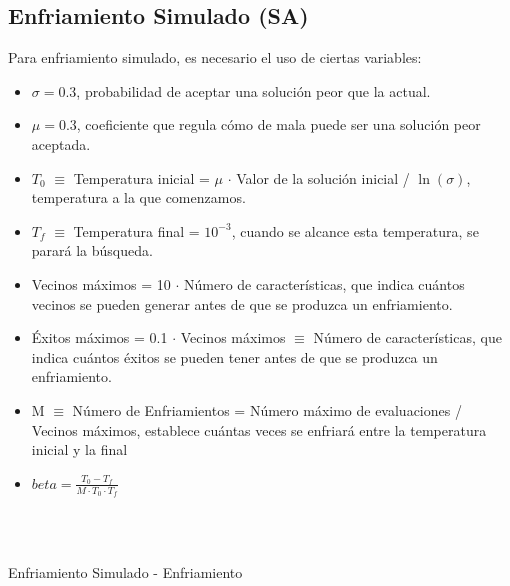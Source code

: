 \documentclass[a4paper, 11pt]{article}
\begin{document}
		\subsection{Enfriamiento Simulado (\textbf{SA})}
			Para enfriamiento simulado, es necesario el uso de ciertas variables:
			\begin{itemize}
				\item $\sigma = 0.3$, probabilidad de aceptar una solución peor que la actual.
				\item $\mu = 0.3$, coeficiente que regula cómo de mala puede ser una solución peor
				aceptada.
				\item $T_0$ $\equiv$ Temperatura inicial = $\mu$ $\cdot$ Valor de la solución inicial / $\ln(\sigma)$,
				temperatura a la que comenzamos.
				\item $T_f$ $ \equiv$ Temperatura final = $10^{-3}$, cuando se alcance esta temperatura, se parará la
				búsqueda.
				\item Vecinos máximos = 10 $\cdot$ Número de características, que indica cuántos vecinos
				se pueden generar antes de que se produzca un enfriamiento.
				\item Éxitos máximos = 0.1 $\cdot$ Vecinos máximos $\equiv$ Número de características,
				que indica cuántos éxitos se pueden tener antes de que se produzca un enfriamiento.
				\item M $\equiv$ Número de Enfriamientos = Número máximo de evaluaciones / Vecinos máximos,
				establece cuántas veces se enfriará entre la temperatura inicial y la final
				\item $\displaystyle beta = \frac{T_0 - T_f}{M \cdot T_0 \cdot T_f}$
			\end{itemize}

			\begin{algorithm}[H]
				\begin{algorithmic}[1]
					\REQUIRE \ \\
							 \
							 
				\end{algorithmic}
			\caption{Enfriamiento Simulado - Enfriamiento}
			\label{SA-Annealing}
			\end{algorithm}
\end{document}
